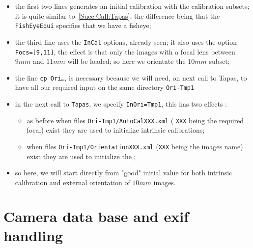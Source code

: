 \begin{itemize}
   \item  the first two lines generates an initial calibration  with the calibration subsets;
          it is quite similar to~\ref{Succ:Call:Tapas}, the difference being that the
          {\tt FishEyeEqui} specifies that we have a fisheye;

   \item  the third line uses the  {\tt InCal} options, already seen;  it also
          uses the option {\tt Focs=[9,11]}, the effect is   that only the images
          with a focal lens between $9mm$ and $11mm$ will be loaded; so here we orientate
          the $10mm$ subset;

   \item the line {\tt cp Ori\dots}, is necessary because we will need, on next call to Tapas,
         to have all our required input on the same directory {\tt Ori-Tmp1}

    \item in the next call to {\tt Tapas}, we specify {\tt InOri=Tmp1},  this has two effects :

\begin{itemize}
         \item  as before when files {\tt Ori-Tmp1/AutoCalXXX.xml} ( {\tt XXX} being the required focal) exist
                they are used to initialize intrinsic calibrations;

         \item  when files  {\tt Ori-Tmp1/OrientationXXX.xml} ({\tt XXX} being the images
                name) exist they are used to initialize the ;%
\end{itemize}
    \item  so here, we will start directly from "good" initial value for both intrinsic calibration
           and external orientation of $10mm$ images.

\end{itemize}



\section{Camera data base and exif handling}

